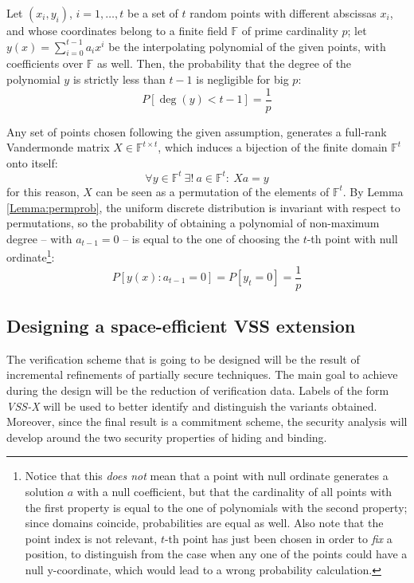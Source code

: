 \documentclass[10pt,journal,cspaper,compsoc]{IEEEtran}
\begin{document}
\begin{thm}
\label{thm:probdegreeinterp}
Let $(x_i,y_i)$, $i=1,\ldots,t$ be a set of $t$ random points with different abscissas $x_i$, and whose coordinates belong to a finite field $\mathbb{F}$ of prime cardinality $p$;
let $y(x) = \mathop \sum \limits_{i=0}^{t-1} {a_i x^i}$ be the interpolating polynomial of the given points, with coefficients over $\mathbb{F}$ as well.
Then, the probability that the degree of the polynomial  $y$ is strictly less than $t-1$ is negligible for big $p$:
$$ P[\deg(y) < t-1] = \frac{1}{p}$$
\end{thm}

\begin{IEEEproof}
Any set of points chosen following the given assumption, generates a full-rank Vandermonde matrix $X \in \mathbb{F}^{t\times t}$, which induces a bijection of the finite domain $\mathbb{F}^t$ onto itself:
$$\forall y \in \mathbb{F}^t~\exists!~a \in \mathbb{F}^t :~ Xa = y$$
for this reason, $X$ can be seen as a permutation of the elements of $\mathbb{F}^t$.
By Lemma \ref{Lemma:permprob}, the uniform discrete distribution is invariant with respect to permutations, so the probability of obtaining a polynomial of non-maximum degree -- with $a_{t-1}=0$ -- is equal to the one of choosing the $t$-th point with null ordinate\footnote{Notice that this \emph{does not} mean that a point with null ordinate generates a solution $a$ with a null coefficient, but that the cardinality of all points with the first property is equal to the one of polynomials with the second property; since domains coincide, probabilities are equal as well.
Also note that the point index is not relevant, $t$-th point has just been chosen in order to \emph{fix} a position, to distinguish from the case when any one of the points could have a null y-coordinate, which would lead to a wrong probability calculation.}:
$$ P[y(x) : a_{t-1} = 0] = P[y_t = 0] = \frac{1}{p} $$
\end{IEEEproof}

\subsection{Designing a space-efficient VSS extension}
The verification scheme that is going to be designed will be the result of incremental refinements of partially secure techniques. The main goal to achieve during the design will be the reduction of verification data. Labels of the form \emph{VSS-X} will be used to better identify and distinguish the variants obtained.
Moreover, since the final result is a commitment scheme, the security analysis will develop around the two security properties of hiding and binding.
\end{document}
